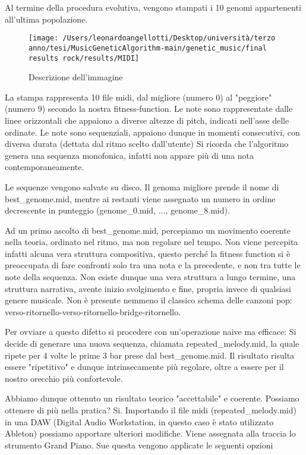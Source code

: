 \documentclass[a4paper,12pt]{report}
\begin{document}
Al termine della procedura evolutiva, vengono stampati i 10 genomi appartenenti all'ultima popolazione.

\begin{figure}[h!]
    \centering
    \texttt{[image: /Users/leonardoangellotti/Desktop/università/terzo anno/tesi/MusicGeneticAlgorithm-main/genetic\_music/final results rock/results/MIDI]} 
    \caption{Descrizione dell'immagine}
    \label{fig:immagine}
\end{figure}

La stampa rappresenta 10 file midi, dal migliore (numero 0) al "peggiore" (numero 9) secondo la nostra fitness-function.
Le note sono rappresentate dalle linee orizzontali che appaiono a diverse altezze di pitch, indicati nell'asse delle ordinate.
Le note sono sequenziali, appaiono dunque in momenti consecutivi, con diversa durata (dettata dal ritmo scelto dall'utente)
Si ricorda che l'algoritmo genera una sequenza monofonica, infatti non appare più di una nota contemporaneamente.

Le sequenze vengono salvate su disco. 
Il genoma migliore prende il nome di best_genome.mid, mentre ai restanti viene assegnato un numero in ordine decrescente in punteggio (genome_0.mid, ..., genome_8.mid).

Ad un primo ascolto di best_genome.mid, percepiamo un movimento coerente nella teoria, ordinato nel ritmo, ma non regolare nel tempo. 
Non viene percepita infatti alcuna vera struttura compositiva, questo perché la fitness function si è preoccupata di fare confronti solo tra una nota e la precedente, e non tra tutte le note della sequenza.
Non esiste dunque una vera struttura a lungo termine, una struttura narrativa, avente inizio svolgimento e fine, propria invece di qualsiasi genere musicale.
Non è presente nemmeno il classico schema delle canzoni pop: verso-ritornello-verso-ritornello-bridge-ritornello.

Per ovviare a questo difetto si procedere con un'operazione naive ma efficace:
Si decide di generare una nuova sequenza, chiamata repeated_melody.mid, la quale ripete per 4 volte le prime 3 bar prese dal best_genome.mid.
Il risultato risulta essere "ripetitivo" e dunque intrinsecamente più regolare, oltre a essere per il nostro orecchio più confortevole.

Abbiamo dunque ottenuto un risultato teorico "accettabile" e coerente. 
Possiamo ottenere di più nella pratica?
Si.
Importando il file midi (repeated_melody.mid) in una DAW (Digital Audio Workstation, in questo caso è stato utilizzato Ableton) possiamo apportare ulteriori modifiche.
Viene assegnata alla traccia lo strumento Grand Piano. 
Sue questa vengono applicate le seguenti opzioni
\end{document}
